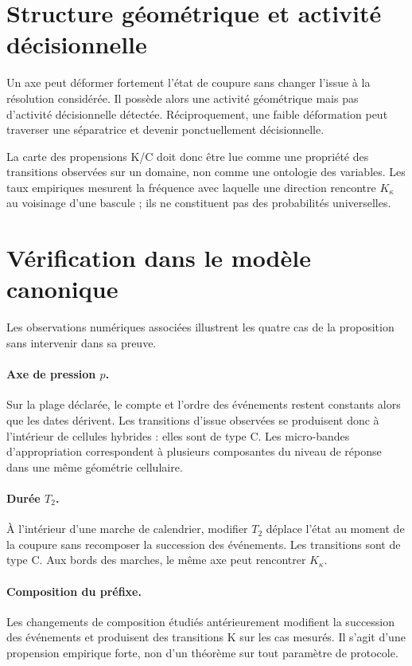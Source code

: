 \section{Structure géométrique et activité décisionnelle}
\label{annexe-J-structure-activite}

Un axe peut déformer fortement l'état de coupure sans changer l'issue à
la résolution considérée. Il possède alors une activité géométrique mais
pas d'activité décisionnelle détectée. Réciproquement, une faible
déformation peut traverser une séparatrice et devenir ponctuellement
décisionnelle.

La carte des propensions K/C doit donc être lue comme une propriété des
transitions observées sur un domaine, non comme une ontologie des
variables. Les taux empiriques mesurent la fréquence avec laquelle une
direction rencontre $K_\kappa$ au voisinage d'une bascule ; ils ne
constituent pas des probabilités universelles.

\section{Vérification dans le modèle canonique}
\label{annexe-J-verification}

Les observations numériques associées illustrent les quatre cas de la
proposition sans intervenir dans sa preuve.

\paragraph{Axe de pression $p$.}
Sur la plage déclarée, le compte et l'ordre des événements restent
constants alors que les dates dérivent. Les transitions d'issue
observées se produisent donc à l'intérieur de cellules hybrides : elles
sont de type C. Les micro-bandes d'appropriation correspondent à plusieurs
composantes du niveau de réponse dans une même géométrie cellulaire.

\paragraph{Durée $T_2$.}
À l'intérieur d'une marche de calendrier, modifier $T_2$ déplace l'état
au moment de la coupure sans recomposer la succession des événements.
Les transitions sont de type C. Aux bords des marches, le même axe peut
rencontrer $K_\kappa$.

\paragraph{Composition du préfixe.}
Les changements de composition étudiés antérieurement modifient la
succession des événements et produisent des transitions K sur les cas
mesurés. Il s'agit d'une propension empirique forte, non d'un théorème
sur tout paramètre de protocole.

